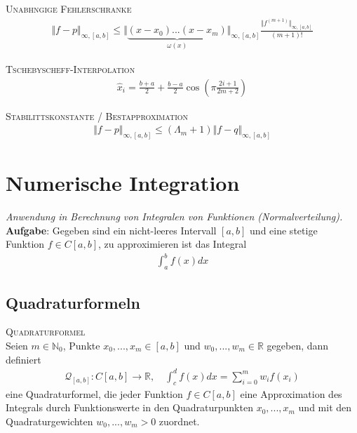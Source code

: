 \textsc{Unabh\a ngige Fehlerschranke}\\
\begin{align*}
\Vert f-p \Vert_{\infty,[a,b]} \leq \Vert \underbrace{(x - x_0 )...(x - x_m )}_{\omega(x)} \Vert_{\infty,[a,b]} \frac{\Vert f^{(m+1)} \Vert_{\infty,[a,b]}}{(m+1)!}
\end{align*}

\textsc{Tschebyscheff-Interpolation}\\
\begin{align*}
\hat{x}_i = \frac{b+a}{2} + \frac{b-a}{2} \cos \left( \pi \frac{2i+1}{2m+2}\right)
\end{align*}

\textsc{Stabilit\a tskonstante / Bestapproximation}\\
\begin{align*}
\Vert f-p \Vert_{\infty,[a,b]} \leq (\Lambda_m + 1) \Vert f-q \Vert_{\infty,[a,b]} 
\end{align*}

\section{Numerische Integration}
\emph{Anwendung in Berechnung von Integralen von Funktionen (Normalverteilung).}\\

\textbf{Aufgabe}:
Gegeben sind ein nicht-leeres Intervall $[a,b]$ und eine stetige
Funktion $f \in C[a,b]$, zu approximieren ist das Integral
\begin{align*}
\int_a^b f(x) dx
\end{align*}

\subsection{Quadraturformeln}
\textsc{Quadraturformel}\\
Seien $m \in \mathbb{N}_0$, Punkte $x_0, ..., x_m \in [a,b]$ und $w_0, ..., w_m \in \mathbb{R}$ gegeben, dann definiert 
\begin{align*}
\mathcal{Q}_{[a,b]}: C[a,b] \rightarrow \mathbb{R}, \quad \int_c^d f(x) dx = \sum_{i=0}^m w_if(x_i)
\end{align*}
eine Quadraturformel, die jeder Funktion $f \in C[a,b]$ eine Approximation des Integrals durch Funktionswerte in den Quadraturpunkten $x_0 ,...,x_m$ und mit den Quadraturgewichten $w_0,...,w_m>0$ zuordnet.\vspace{0.2cm}

